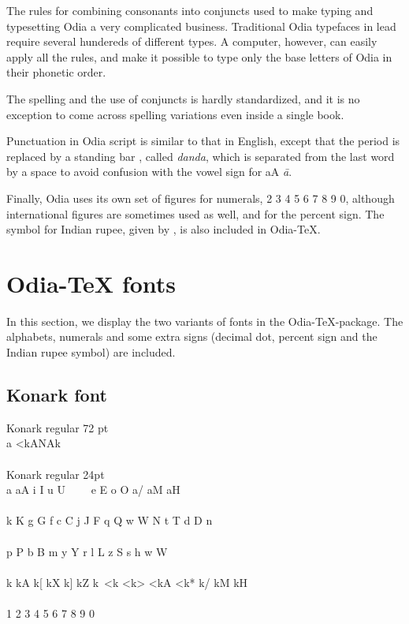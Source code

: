 \documentclass[12pt]{article}
\def\odtex{Odia-\TeX}
\begin{document}
The rules for combining consonants into conjuncts used to make typing and typesetting
Odia a very complicated business.
Traditional Odia typefaces in lead require several hundereds of different types.
A computer, however, can easily apply all the rules, and
make it possible to type only the base letters of Odia in their phonetic order.

The spelling and the use of conjuncts is hardly standardized, and it is no exception
to come across spelling variations even inside a single book.

Punctuation in Odia script is similar to that in English, except that
the period is replaced by a standing bar {\knrk\oddanda}, called
{\it danda}, which is separated from the last word by a space to avoid
confusion with the vowel sign for {\knrk aA} {\it \=a}.

Finally, Odia uses its own set of figures for numerals, { 2 3 4 5 6 7 8 9 0}, although
international figures are sometimes used as well, and {\knrk \odpercent} for the percent sign. The symbol for Indian 
rupee, given by {\knrk \odrupee}, is also included in \odtex.


\newpage

\section{\odtex{} fonts}

\def\odalphabet{\\a aA i I u U \odvowelri\ e E o O a/ aM aH\\
k K g G f c C j J F q Q w W N t T d D n\\
p P b B m y Y r l L z S s h\\}
\def\odmatras{k kA k[ kX k] kZ k\odsignri\ <k <k> <kA <k* k/ kM kH}
\def\odfigures{1 2 3 4 5 6 7 8 9 0 }
\def\odsigns{\oddecimaldot{} \odpercent{} \odrupee{} }

In this section, we display the two variants of fonts in the \odtex-package. The alphabets, numerals and some extra signs (decimal dot,
percent sign and the Indian rupee symbol) are included.

\subsection{Konark font}
Konark regular 72 pt\\
{\hugeknrk{}a <kANAk\odreph}\\ \\
Konark regular 24pt\\
{\largeknrk{}a aA i I u U \odvowelri\ \odvowelrii\ \odvowelli\ \odvowellii\ e E o O a/ aM aH}\\ \\
{\largeknrk{}k K g G f c C j J F q Q w W N t T d D n}\\ \\
{\largeknrk{}p P b B m y Y r l L z S s h \odkSa{} w\odnukta{} W\odnukta}\\ \\
{\bigknrk{}\odmatras}\\ \\
{\bigknrk{}\odfigures}\\ \\
{\bigknrk{}\odsigns}
\end{document}
